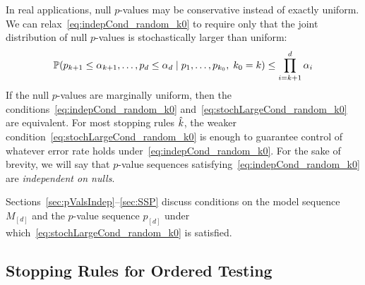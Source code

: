 \documentclass{article}
\begin{document}
In real applications, null $p$-values may be conservative instead of exactly uniform. We can relax~\eqref{eq:indepCond_random_k0} to require only that the joint distribution of null $p$-values is stochastically larger than uniform:
\begin{equation}\label{eq:stochLargeCond_random_k0}
  \P(p_{k+1} \leq \alpha_{k+1}, \ldots, p_d \leq \alpha_d
  \mid p_1, \ldots, p_{k_0}, \; k_0 = k) \leq \prod_{i=k+1}^d \alpha_i
\end{equation}
If the null $p$-values are marginally uniform, then the conditions~\eqref{eq:indepCond_random_k0} and~\eqref{eq:stochLargeCond_random_k0} are equivalent. For most stopping rules $\hk$, the weaker condition~\eqref{eq:stochLargeCond_random_k0} is enough to guarantee control of whatever error rate holds under~\eqref{eq:indepCond_random_k0}. For the sake of brevity, we will say that $p$-value sequences satisfying~\eqref{eq:indepCond_random_k0} are {\em independent on nulls}.

Sections~\ref{sec:pValsIndep}--\ref{sec:SSP} discuss conditions on the model sequence $M_{[d]}$ and the $p$-value sequence $p_{[d]}$ under which~\eqref{eq:stochLargeCond_random_k0} is satisfied.

\subsection{Stopping Rules for Ordered Testing}\label{sec:orderedProposals}

\end{document}
